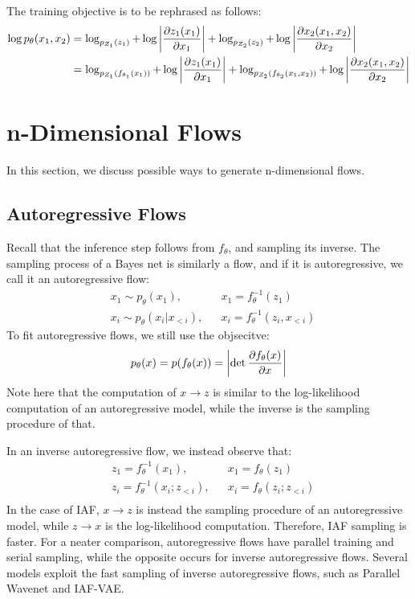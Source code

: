 The training objective is to be rephrased as follows:
\begin{align*}
    \log p_\theta (x_1, x_2)
    &= \log_{p_{Z_1} (z_1)} + \log \left| \pdv{z_1(x_1)}{x_1} \right| + \log_{p_{Z_2} (z_2)} + \log \left| \pdv{x_2(x_1, x_2)}{x_2} \right| \\
    &= \log_{p_{Z_1} (f_{\theta_1} (x_1))} + \log \left| \pdv{z_1(x_1)}{x_1} \right| + \log_{p_{Z_2} (f_{\theta_2} (x_1, x_2))} + \log \left| \pdv{x_2(x_1, x_2)}{x_2} \right| \\
\end{align*}

\section{n-Dimensional Flows}
In this section, we discuss possible ways to generate n-dimensional flows.

\subsection{Autoregressive Flows}
Recall that the inference step follows from $f_\theta$, and sampling its inverse.
The sampling process of a Bayes net is similarly a flow, and if it is autoregressive, we call it an autoregressive flow:
\begin{align*}
    &x_1 \sim p_\theta(x_1), &&x_1 = f_\theta^{-1} (z_1) \\
    &x_i \sim p_\theta(x_i | x_{<i}), &&x_i = f_\theta^{-1} (z_i, x_{<i})
\end{align*}
To fit autoregressive flows, we still use the objsecitve:
\[
    p_\theta(x) = p(f_\theta (x)) = \left| \det \pdv{f_\theta (x)}{x} \right|
\]
Note here that the computation of $x \rightarrow z$ is similar to the log-likelihood computation of an autoregressive model, while the inverse is the sampling procedure of that.

In an inverse autoregressive flow, we instead observe that:
\begin{align*}
    &z_1 = f_\theta^{-1}(x_1), &&x_1 = f_\theta (z_1) \\
    &z_i = f_\theta^{-1}(x_i; z_{<i}), &&x_i = f_\theta (z_i; z_{<i}) \\
\end{align*}
In the case of IAF, $x \rightarrow z$ is instead the sampling procedure of an autoregressive model, while $z \rightarrow x$ is the log-likelihood computation.
Therefore, IAF sampling is faster.
For a neater comparison, autoregressive flows have parallel training and serial sampling, while the opposite occurs for inverse autoregressive flows.
Several models exploit the fast sampling of inverse autoregressive flows, such as Parallel Wavenet and IAF-VAE.

